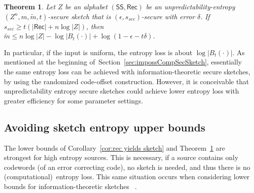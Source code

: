 \documentclass[11pt]{article}
\newcommand{\secref}[1]{\mbox{Section~\ref{#1}}}
\newcommand{\thref}[1]{\mbox{Theorem~\ref{#1}}}
\newcommand{\corref}[1]{\mbox{Corollary~\ref{#1}}}
\newcommand{\class}[1]{{\ensuremath{\mathsf{#1}}}}
\newcommand{\sketch}{\ensuremath{\class{SS}}\xspace}
\newcommand{\rec}{\ensuremath{\class{Rec}}\xspace}
\newtheorem{theorem}{Theorem}[section]
\newcommand{\authnote}[2]{{\textcolor{red}{\textsf{#1 notes: }\textcolor{blue}{ #2}}\marginpar{\textcolor{red}{\textbf{!!!!!}}}}}
\newcommand{\authnote}[2]{}
\newcommand{\lnote}[1]{{\authnote{Leo}{#1}}}
\begin{document}
\begin{theorem}
\label{thm:imp of unp entropy}
Let $Z$ be an alphabet $(\sketch, \rec)$ be an unpredictability-entropy $(Z^n, m, \tilde{m}, t)$-secure sketch that is $(\epsilon, s_{sec})$-secure with error $\delta$.  If $s_{sec} \geq t(|\rec|+n\log |Z|)$, then $\tilde{m}\leq n\log |Z| - \log |B_t(\cdot)| + \log(1-\epsilon -t\delta)$.
\end{theorem}
In particular, if the input is uniform, the entropy loss is about $\log |B_t(\cdot)|$.  As mentioned at the beginning of~\secref{sec:impossCompSecSketch}, essentially the same entropy loss can be achieved with information-theoretic secure sketches, by using the randomized code-offset construction. However, it is conceivable that unpredictability entropy secure sketches could achieve lower entropy loss with greater efficiency for some parameter settings.



\subsection{Avoiding sketch entropy upper bounds}
\label{ssec:avoiding bounds}

The lower bounds of \corref{cor:rec yields sketch} and \thref{thm:imp of unp entropy} are strongest for high entropy sources.  
This is necessary, if a source contains only codewords (of an error correcting code), no sketch is needed, and thus there is no (computational)~entropy loss.  
This same situation occurs when considering lower bounds for information-theoretic sketches~\cite[Appendix C]{DBLP:journals/siamcomp/DodisORS08} .
\end{document}
